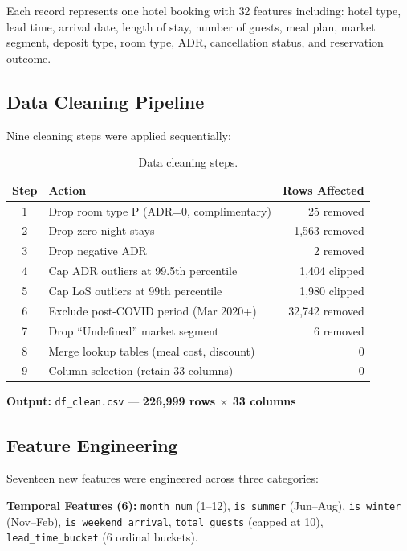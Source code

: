 \documentclass[12pt,a4paper,openany]{report}
\begin{document}
Each record represents one hotel booking with 32 features including: hotel type, lead time, arrival date, length of stay, number of guests, meal plan, market segment, deposit type, room type, ADR, cancellation status, and reservation outcome.

\subsection{Data Cleaning Pipeline}

Nine cleaning steps were applied sequentially:

\begin{table}[H]
\centering
\caption{Data cleaning steps.}
\label{tab:cleaning}
\small
\begin{tabular}{@{}clr@{}}
\toprule
\textbf{Step} & \textbf{Action} & \textbf{Rows Affected} \\
\midrule
1 & Drop room type P (ADR=0, complimentary)     & 25 removed \\
2 & Drop zero-night stays                       & 1,563 removed \\
3 & Drop negative ADR                           & 2 removed \\
4 & Cap ADR outliers at 99.5th percentile        & 1,404 clipped \\
5 & Cap LoS outliers at 99th percentile          & 1,980 clipped \\
6 & Exclude post-COVID period (Mar 2020+)        & 32,742 removed \\
7 & Drop ``Undefined'' market segment            & 6 removed \\
8 & Merge lookup tables (meal cost, discount)    & 0 \\
9 & Column selection (retain 33 columns)         & 0 \\
\bottomrule
\end{tabular}
\end{table}

\textbf{Output:} \texttt{df\_clean.csv} --- \textbf{226,999 rows $\times$ 33 columns}

\subsection{Feature Engineering}

Seventeen new features were engineered across three categories:

\textbf{Temporal Features (6):} \texttt{month\_num} (1--12), \texttt{is\_summer} (Jun--Aug), \texttt{is\_winter} (Nov--Feb), \texttt{is\_weekend\_arrival}, \texttt{total\_guests} (capped at 10), \texttt{lead\_time\_bucket} (6 ordinal buckets).
\end{document}
